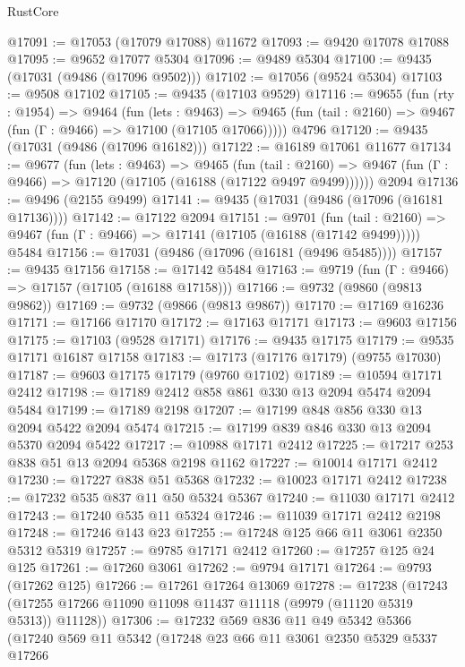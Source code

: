 \begin{lexlean}{RustCore}
\begin{coremodule}
@17091 := @17053 (@17079 @17088) @11672
@17093 := @9420 @17078 @17088
@17095 := @9652 @17077 @5304
@17096 := @9489 @5304
@17100 := @9435 (@17031 (@9486 (@17096 @9502)))
@17102 := @17056 (@9524 @5304)
@17103 := @9508 @17102
@17105 := @9435 (@17103 @9529)
@17116 := @9655
    (fun (rty : @1954) =>
    @9464
      (fun (lets : @9463) =>
      @9465 (fun (tail : @2160) => @9467 (fun (Γ : @9466) => @17100 (@17105 @17066)))))
    @4796
@17120 := @9435 (@17031 (@9486 (@17096 @16182)))
@17122 := @16189 @17061 @11677
@17134 := @9677
    (fun (lets : @9463) =>
    @9465
      (fun (tail : @2160) =>
      @9467 (fun (Γ : @9466) => @17120 (@17105 (@16188 (@17122 @9497 @9499))))))
    @2094
@17136 := @9496 (@2155 @9499)
@17141 := @9435 (@17031 (@9486 (@17096 (@16181 @17136))))
@17142 := @17122 @2094
@17151 := @9701
    (fun (tail : @2160) => @9467 (fun (Γ : @9466) => @17141 (@17105 (@16188 (@17142 @9499)))))
    @5484
@17156 := @17031 (@9486 (@17096 (@16181 (@9496 @5485))))
@17157 := @9435 @17156
@17158 := @17142 @5484
@17163 := @9719 (fun (Γ : @9466) => @17157 (@17105 (@16188 @17158)))
@17166 := @9732 (@9860 (@9813 @9862))
@17169 := @9732 (@9866 (@9813 @9867))
@17170 := @17169 @16236
@17171 := @17166 @17170
@17172 := @17163 @17171
@17173 := @9603 @17156
@17175 := @17103 (@9528 @17171)
@17176 := @9435 @17175
@17179 := @9535 @17171 @16187 @17158
@17183 := @17173 (@17176 @17179) (@9755 @17030)
@17187 := @9603 @17175 @17179 (@9760 @17102)
@17189 := @10594 @17171 @2412
@17198 := @17189 @2412 @858 @861 @330 @13 @2094 @5474 @2094 @5484
@17199 := @17189 @2198
@17207 := @17199 @848 @856 @330 @13 @2094 @5422 @2094 @5474
@17215 := @17199 @839 @846 @330 @13 @2094 @5370 @2094 @5422
@17217 := @10988 @17171 @2412
@17225 := @17217 @253 @838 @51 @13 @2094 @5368 @2198 @1162
@17227 := @10014 @17171 @2412
@17230 := @17227 @838 @51 @5368
@17232 := @10023 @17171 @2412
@17238 := @17232 @535 @837 @11 @50 @5324 @5367
@17240 := @11030 @17171 @2412
@17243 := @17240 @535 @11 @5324
@17246 := @11039 @17171 @2412 @2198
@17248 := @17246 @143 @23
@17255 := @17248 @125 @66 @11 @3061 @2350 @5312 @5319
@17257 := @9785 @17171 @2412
@17260 := @17257 @125 @24 @125
@17261 := @17260 @3061
@17262 := @9794 @17171
@17264 := @9793 (@17262 @125)
@17266 := @17261 @17264 @13069
@17278 := @17238
    (@17243 (@17255 @17266 @11090 @11098 @11437 @11118 (@9979 (@11120 @5319 @5313)) @11128))
@17306 := @17232
    @569
    @836
    @11
    @49
    @5342
    @5366
    (@17240
      @569
      @11
      @5342
      (@17248
        @23
        @66
        @11
        @3061
        @2350
        @5329
        @5337
        @17266

\end{coremodule}
\end{lexlean}

